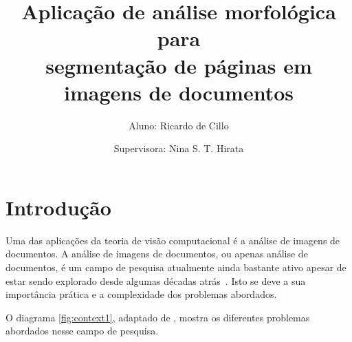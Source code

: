 \documentclass[times, 10pt,twocolumn]{article}
\begin{document}
\title{Aplicação de análise morfológica para \\segmentação de páginas em imagens de documentos}
\author{Aluno: Ricardo de Cillo\\
\and
Supervisora: Nina S. T. Hirata \\
}

\maketitle
\thispagestyle{empty}



\section{Introdução}

Uma das aplicações da teoria de visão computacional é a análise de
imagens de documentos. A análise de imagens de documentos, ou apenas
análise de documentos, é um campo de pesquisa atualmente ainda
bastante ativo apesar de estar sendo explorado desde algumas décadas
atrás~\cite{10.1109/ICDAR.2007.207}. Isto se deve a sua importância
prática e a complexidade dos problemas abordados.

O diagrama \ref{fig:context1}, adaptado de
\cite{Kasturi_OGorman_Govindaraju_2002}, mostra os diferentes
problemas abordados nesse campo de pesquisa. 
\end{document}
